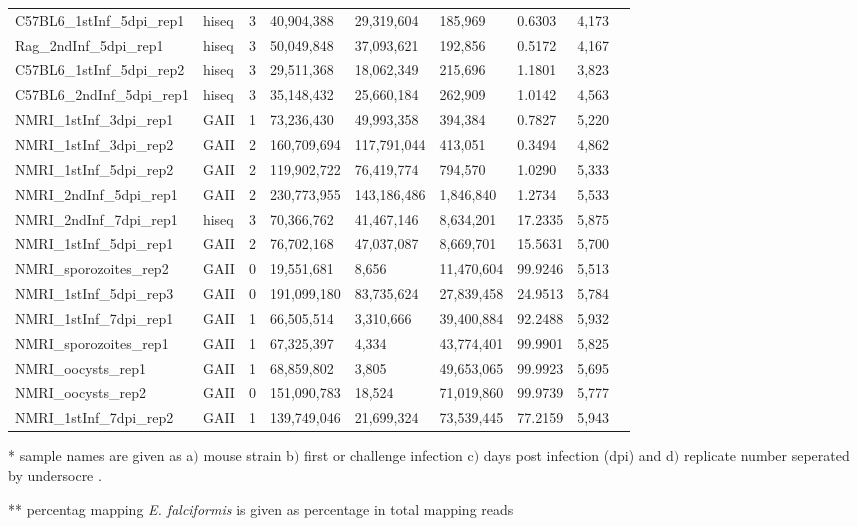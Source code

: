 \documentclass{bmcart}
\begin{document}
\begin{backmatter}
\begin{table}[ht]
\begin{tabular}{lllllllll}
  C57BL6\_1stInf\_5dpi\_rep1 & hiseq & 3 & 40,904,388 & 29,319,604 & 185,969 & 0.6303 & 4,173 \\ 
  Rag\_2ndInf\_5dpi\_rep1 & hiseq & 3 & 50,049,848 & 37,093,621 & 192,856 & 0.5172 & 4,167 \\ 
  C57BL6\_1stInf\_5dpi\_rep2 & hiseq & 3 & 29,511,368 & 18,062,349 & 215,696 & 1.1801 & 3,823 \\ 
  C57BL6\_2ndInf\_5dpi\_rep1 & hiseq & 3 & 35,148,432 & 25,660,184 & 262,909 & 1.0142 & 4,563 \\ 
  NMRI\_1stInf\_3dpi\_rep1 & GAII & 1 & 73,236,430 & 49,993,358 & 394,384 & 0.7827 & 5,220 \\ 
  NMRI\_1stInf\_3dpi\_rep2 & GAII & 2 & 160,709,694 & 117,791,044 & 413,051 & 0.3494 & 4,862 \\ 
  NMRI\_1stInf\_5dpi\_rep2 & GAII & 2 & 119,902,722 & 76,419,774 & 794,570 & 1.0290 & 5,333 \\ 
  NMRI\_2ndInf\_5dpi\_rep1 & GAII & 2 & 230,773,955 & 143,186,486 & 1,846,840 & 1.2734 & 5,533 \\ 
  NMRI\_2ndInf\_7dpi\_rep1 & hiseq & 3 & 70,366,762 & 41,467,146 & 8,634,201 & 17.2335 & 5,875 \\ 
  NMRI\_1stInf\_5dpi\_rep1 & GAII & 2 & 76,702,168 & 47,037,087 & 8,669,701 & 15.5631 & 5,700 \\ 
  NMRI\_sporozoites\_rep2 & GAII & 0 & 19,551,681 & 8,656 & 11,470,604 & 99.9246 & 5,513 \\ 
  NMRI\_1stInf\_5dpi\_rep3 & GAII & 0 & 191,099,180 & 83,735,624 & 27,839,458 & 24.9513 & 5,784 \\ 
  NMRI\_1stInf\_7dpi\_rep1 & GAII & 1 & 66,505,514 & 3,310,666 & 39,400,884 & 92.2488 & 5,932 \\ 
  NMRI\_sporozoites\_rep1 & GAII & 1 & 67,325,397 & 4,334 & 43,774,401 & 99.9901 & 5,825 \\ 
  NMRI\_oocysts\_rep1 & GAII & 1 & 68,859,802 & 3,805 & 49,653,065 & 99.9923 & 5,695 \\ 
  NMRI\_oocysts\_rep2 & GAII & 0 & 151,090,783 & 18,524 & 71,019,860 & 99.9739 & 5,777 \\ 
  NMRI\_1stInf\_7dpi\_rep2 & GAII & 1 & 139,749,046 & 21,699,324 & 73,539,445 & 77.2159 & 5,943 \\ 
   \hline
\end{tabular}
\begin{tablenotes}[flushleft]\footnotesize\singlespacing
\item{*} sample names are given as a$)$ mouse strain b$)$ first or challenge
  infection c$)$ days post infection (dpi) and d$)$ replicate number
  seperated by undersocre . \\
\item{**} percentag mapping \textit{E. falciformis} is given as percentage in total mapping reads
\end{tablenotes}
\end{table}
\hspace*{+2.5cm}






\end{backmatter}
\end{document}
